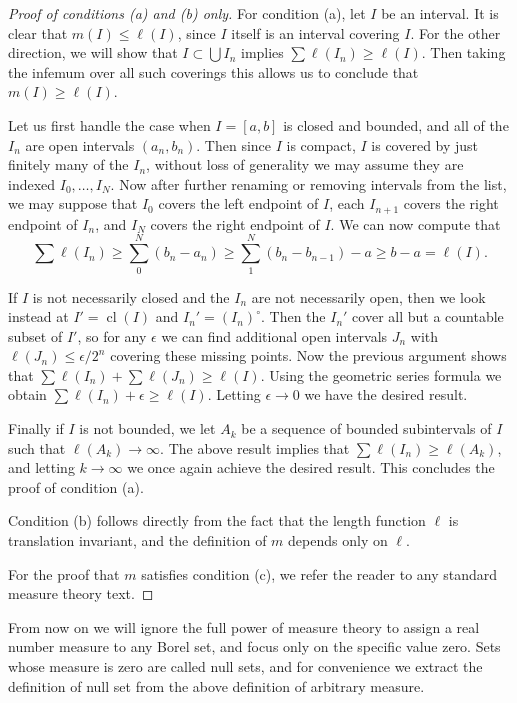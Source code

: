 \documentclass[11pt,oneside,a4paper]{amsbook}
\DeclareMathOperator{\cl}{cl}
\theoremstyle{definition}
\theoremstyle{plain}
\theoremstyle{definition}
\theoremstyle{remark}
\numberwithin{equation}{section}
\numberwithin{figure}{section}
\begin{document}
\begin{proof}[Proof of conditions (a) and (b) only]
  For condition (a), let $I$ be an interval. It is clear that $m(I)\leq\ell(I)$, since $I$ itself is an interval covering $I$. For the other direction, we will show that $I\subset\bigcup I_n$ implies $\sum\ell(I_n)\geq\ell(I)$. Then taking the infemum over all such coverings this allows us to conclude that $m(I)\geq\ell(I)$.

  Let us first handle the case when $I=[a,b]$ is closed and bounded, and all of the $I_n$ are open intervals $(a_n,b_n)$. Then since $I$ is compact, $I$ is covered by just finitely many of the $I_n$, without loss of generality we may assume they are indexed $I_0,\ldots,I_N$. Now after further renaming or removing intervals from the list, we may suppose that $I_0$ covers the left endpoint of $I$, each $I_{n+1}$ covers the right endpoint of $I_n$, and $I_N$ covers the right endpoint of $I$. We can now compute that
  \[\sum\ell(I_n)
  \geq\sum_0^N(b_n-a_n)
  \geq\sum_1^N(b_n-b_{n-1})-a
  \geq b-a
  = \ell(I)\text{.}
  \]

  If $I$ is not necessarily closed and the $I_n$ are not necessarily open, then we look instead at $I'=\cl(I)$ and $I_n'=(I_n)^\circ$. Then the $I_n'$ cover all but a countable subset of $I'$, so for any $\epsilon$ we can find additional open intervals $J_n$ with $\ell(J_n)\leq\epsilon/2^n$ covering these missing points. Now the previous argument shows that $\sum\ell(I_n)+\sum\ell(J_n)\geq\ell(I)$. Using the geometric series formula we obtain $\sum\ell(I_n)+\epsilon\geq\ell(I)$. Letting $\epsilon\to0$ we have the desired result.

  Finally if $I$ is not bounded, we let $A_k$ be a sequence of bounded subintervals of $I$ such that $\ell(A_k)\to\infty$. The above result implies that $\sum\ell(I_n)\geq\ell(A_k)$, and letting $k\to\infty$ we once again achieve the desired result. This concludes the proof of condition (a).

  Condition (b) follows directly from the fact that the length function $\ell$ is translation invariant, and the definition of $m$ depends only on $\ell$.

  For the proof that $m$ satisfies condition (c), we refer the reader to any standard measure theory text.
\end{proof}

From now on we will ignore the full power of measure theory to assign a real number measure to any Borel set, and focus only on the specific value zero. Sets whose measure is zero are called null sets, and for convenience we extract the definition of null set from the above definition of arbitrary measure.
\end{document}
